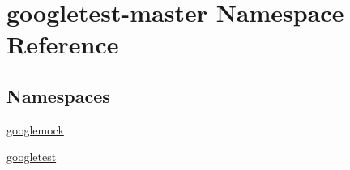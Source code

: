 \hypertarget{namespacegoogletest-master}{}\section{googletest-\/master Namespace Reference}
\label{namespacegoogletest-master}
\subsection*{Namespaces}
\begin{DoxyCompactItemize}
\item 
 \mbox{\hyperlink{namespacegoogletest-master_1_1googlemock}{googlemock}}
\item 
 \mbox{\hyperlink{namespacegoogletest-master_1_1googletest}{googletest}}
\end{DoxyCompactItemize}
